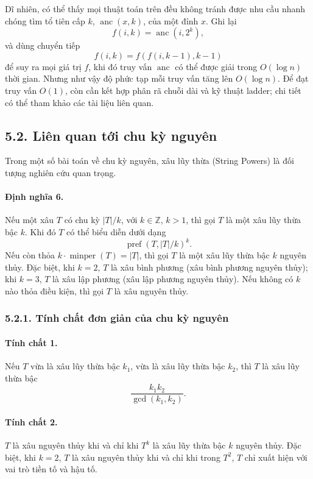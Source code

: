 \documentclass[11pt]{article}
\begin{document}
Dĩ nhiên, có thể thấy mọi thuật toán trên đều không tránh được nhu cầu nhanh
chóng tìm tổ tiên cấp \(k\), \(\operatorname{anc}(x,k)\), của một đỉnh \(x\).
Ghi lại
\[
  f(i,k)=\operatorname{anc}(i,2^k),
\]
và dùng chuyển tiếp
\[
  f(i,k)=f(f(i,k-1),k-1)
\]
để suy ra mọi giá trị \(f\), khi đó truy vấn \(\operatorname{anc}\) có thể
được giải trong \(O(\log n)\) thời gian. Nhưng như vậy độ phức tạp mỗi truy
vấn tăng lên \(O(\log n)\). Để đạt truy vấn \(O(1)\), còn cần kết hợp phân rã
chuỗi dài và kỹ thuật ladder; chi tiết có thể tham khảo các tài liệu liên quan.

\subsection*{5.2. Liên quan tới chu kỳ nguyên}

Trong một số bài toán về chu kỳ nguyên, xâu lũy thừa (String Powers) là đối
tượng nghiên cứu quan trọng.

\paragraph{Định nghĩa 6.}
Nếu một xâu \(T\) có chu kỳ \(|T|/k\), với \(k\in\mathbb Z\), \(k>1\), thì gọi
\(T\) là một xâu lũy thừa bậc \(k\). Khi đó \(T\) có thể biểu diễn dưới dạng
\[
  \operatorname{pref}(T,|T|/k)^k.
\]
Nếu còn thỏa \(k\cdot\operatorname{minper}(T)=|T|\), thì gọi \(T\) là một xâu
lũy thừa bậc \(k\) nguyên thủy. Đặc biệt, khi \(k=2\), \(T\) là xâu bình
phương (xâu bình phương nguyên thủy); khi \(k=3\), \(T\) là xâu lập phương
(xâu lập phương nguyên thủy). Nếu không có \(k\) nào thỏa điều kiện, thì gọi
\(T\) là xâu nguyên thủy.

\subsubsection*{5.2.1. Tính chất đơn giản của chu kỳ nguyên}

\paragraph{Tính chất 1.}
Nếu \(T\) vừa là xâu lũy thừa bậc \(k_1\), vừa là xâu lũy thừa bậc \(k_2\),
thì \(T\) là xâu lũy thừa bậc
\[
  \frac{k_1k_2}{\gcd(k_1,k_2)}.
\]

\paragraph{Tính chất 2.}
\(T\) là xâu nguyên thủy khi và chỉ khi \(T^k\) là xâu lũy thừa bậc \(k\)
nguyên thủy. Đặc biệt, khi \(k=2\), \(T\) là xâu nguyên thủy khi và chỉ khi
trong \(T^2\), \(T\) chỉ xuất hiện với vai trò tiền tố và hậu tố.
\end{document}
